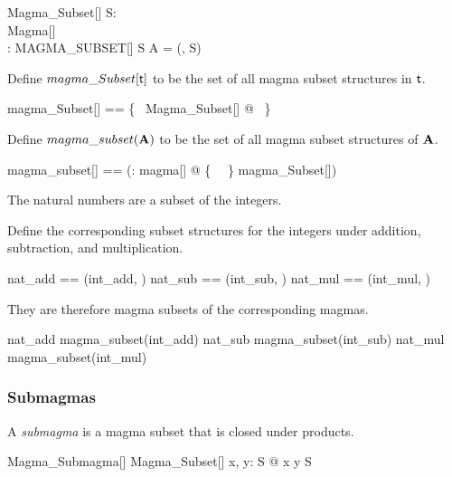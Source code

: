 \documentclass{amsart}
\begin{document}
\begin{schema}{Magma\_Subset}[\genT]
	S: \power \genT \\
	Magma[\genT] \\
	\strucS: MAGMA\_SUBSET[\genT]
\where
	S \subseteq A
\also
	\strucS = (\strucA, S)
\end{schema}

Define $magma\_Subset[\mathsf{t}]$ to be the set of all magma subset structures in $\mathsf{t}$.

\begin{zed}
	magma\_Subset[\genT] == \{~ Magma\_Subset[\genT] @ \strucS ~\}
\end{zed}

Define $magma\_subset(\mathbf{A})$ to be the set of all magma subset structures of $\mathbf{A}$.

\begin{zed}
	magma\_subset[\genT] == (\lambda \strucA: magma[\genT] @ \{~ \strucA ~\} \dres magma\_Subset[\genT])
\end{zed}

\begin{example}
The natural numbers are a subset of the integers.

\begin{zed}
	\nat \subset \num
\end{zed}

Define the corresponding subset structures for the integers under addition, subtraction, and multiplication.

\begin{zed}
	nat\_add == (int\_add, \nat)
\also
	nat\_sub == (int\_sub, \nat)
\also
	nat\_mul == (int\_mul, \nat)
\end{zed}

They are therefore magma subsets of the corresponding magmas.

\begin{zed}
	nat\_add \in magma\_subset(int\_add)
\also
	nat\_sub \in magma\_subset(int\_sub)
\also
	nat\_mul \in magma\_subset(int\_mul)
\end{zed}

\end{example}

\subsubsection{Submagmas}

A \textit{submagma} is a magma subset that is closed under products.

\begin{schema}{Magma\_Submagma}[\genT]
	Magma\_Subset[\genT]
\where
	\forall x, y: S @ x \opG y \in S
\end{schema}
\end{document}
